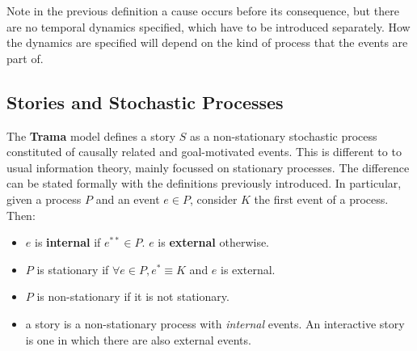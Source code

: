 \documentclass[
		twoside,openright,titlepage,numbers=noenddot,manychapters,
		headinclude,%
                footinclude=false,cleardoublepage=empty,
                BCOR=5mm,
		fontsize=11pt, %
                 enabledeprecatedfontcommands]{scrreprt}
\begin{document}
Note in the previous definition a cause occurs before its consequence, but there are no temporal dynamics specified, which have to be introduced separately. How the dynamics are specified will depend on the kind of process that the events are part of.



\subsection{Stories and Stochastic Processes}

\label{sto_sto}
The \textbf{Trama} model defines a story $S$ as a non-stationary stochastic process constituted of causally related and goal-motivated events. 
This is different to to usual information theory,  mainly focussed on stationary processes.%
The difference can be stated formally with the definitions previously introduced.
 In particular, given a process $P$ and an event $e \in P$, consider $K$ the first event of a process. Then:

\begin{itemize}
	\item  $e$ is \textbf{internal} if $e^{**} \in P$. $e$ is \textbf{external} otherwise.
	\item $P$ is stationary if $\forall e \in P, e^* \equiv K $ and  $e$ is external. %
	\item $P$ is non-stationary if it is not stationary.
	\item a story is a non-stationary process with \emph{internal} events. An interactive story is one in which there are also external events.
\end{itemize}
\end{document}
